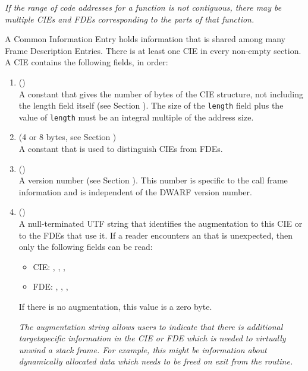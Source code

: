 \textit{If the range of code addresses for a function is not
contiguous, there may be multiple CIEs and FDEs corresponding
to the parts of that function.}

A Common Information Entry holds information that is shared
among many Frame Description Entries. There is at least one
CIE in every non-empty \dotdebugframe{} section. A CIE contains
the following fields, in order:
\begin{enumerate}[1. ]
\item \HFNlength{} ()  \\
A constant that gives the number of bytes of the CIE structure,
not including the length field itself 
(see Section ). 
The
size of the \texttt{length} field plus the value of \texttt{length} must be an
integral multiple of the address size.

\item  \HFNCIEid{} (4 or 8 bytes, see Section ) \\
A constant that is used to distinguish CIEs from FDEs.

\item  \HFNversion{} (\HFTubyte) \\
A version number 
(see Section ). 
This number is specific to the call frame information
and is independent of the DWARF version number.

\item  \HFNaugmentation{} (\HFTaugstring) \\
A null-terminated UTF string that identifies the augmentation
to this CIE or to the FDEs that use it. If a reader encounters an
 that is unexpected, then only the
following fields can be read:

\begin{itemize}

\item CIE: \HFNlength, \HFNCIEid, \HFNversion, \HFNaugmentation

\item FDE: \HFNlength, \HFNCIEpointer, \HFNinitiallocation, \HFNaddressrange

\end{itemize}
If there is no augmentation, this value is a zero byte.

\textit{The augmentation string allows users to indicate that there
is additional target\dash specific information in the CIE or FDE
which is needed to virtually 
unwind a stack frame. For example, this
might be information about dynamically allocated data which
needs to be freed on exit from the routine.}


\end{enumerate}
